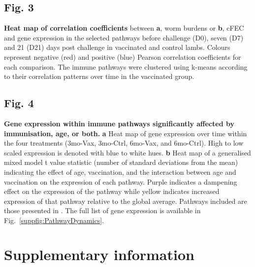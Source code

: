 \documentclass[a4paper, hidelinks, 11pt]{article}
\begin{document}
\subsection{Fig. 3} \label{fig:enet_corr}

\textbf{Heat map of correlation coefficients} between
        \textbf{a}, worm burdens or \textbf{b}, cFEC and gene
        expression in the selected pathways before challenge
        (D0), seven (D7) and 21 (D21) days post challenge in
        vaccinated and control lambs. Colours represent negative
        (red) and positive (blue) Pearson correlation
        coefficients for each comparison. The immune pathways
        were clustered using k-means according to their
        correlation patterns over time in the vaccinated group.

\subsection{Fig. 4} \label{fig:WGCNA_gene_expression}
\textbf{Gene expression within immune pathways
    significantly affected by immunisation, age, or both.}
        \textbf{a} Heat map of gene expression over time within
        the four treatments (3mo-Vax, 3mo-Ctrl, 6mo-Vax, and
        6mo-Ctrl). High to low scaled expression is denoted with
        blue to white hues. \textbf{b} Heat map of a generalised
        mixed model t value statistic (number of standard
        deviations from the mean)~\supercite{Bates2015} indicating
        the effect of age, vaccination, and the interaction
        between age and vaccination on the expression of each
        pathway. Purple indicates a dampening effect on the
        expression of the pathway while yellow indicates
        increased expression of that pathway relative to the
        global average. Pathways included are those presented in
        . The full list of gene expression
        is available in Fig.~\ref{suppfig:PathwayDynamics}.

\pagebreak

\newcommand{\sectionbreak}{\clearpage}

\section{Supplementary information}
\setcounter{page}{1}
\renewcommand{\thepage}{S\arabic{page}}
\setcounter{table}{0}
\renewcommand{\thetable}{S\arabic{table}}
\setcounter{figure}{0}
\renewcommand{\thefigure}{S\arabic{figure}}
\end{document}
